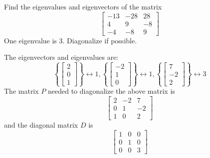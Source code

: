 \documentclass{ximera}
\begin{document}
\begin{problem}\label{prb:8.21} Find the eigenvalues and eigenvectors of the matrix
\begin{equation*}
\left[
\begin{array}{rrr}
-13 & -28 & 28 \\
4 & 9 & -8 \\
-4 & -8 & 9
\end{array}
\right]
\end{equation*}
One eigenvalue is $3.$ Diagonalize if possible.
\begin{hint}
The eigenvectors and eigenvalues are:
\[
\left\{ \left[
\begin{array}{c}
2 \\
0 \\
1
\end{array}
\right] \right\} \leftrightarrow 1, \left\{ \left[
\begin{array}{c}
-2 \\
1 \\
0
\end{array}
\right] \right\} \leftrightarrow 1, \left\{ \left[
\begin{array}{c}
7 \\
-2 \\
2
\end{array}
\right] \right\} \leftrightarrow 3
\]
The matrix $P$ needed to diagonalize the above matrix is
\[
\left[
\begin{array}{rrr}
2 & -2 & 7 \\
0 & 1 & -2 \\
1 & 0 & 2
\end{array}
\right]
\]
and the diagonal matrix $D$ is
\[
\left[
\begin{array}{rrr}
1 & 0 & 0  \\
0 & 1 & 0 \\
0 & 0 & 3
\end{array}
\right]
\]
\end{hint}
\end{problem}
\end{document}
